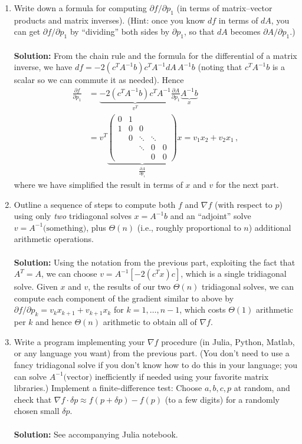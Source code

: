 \documentclass{article}
\begin{document}
\begin{enumerate}
\item Write down a formula for computing $\partial f/\partial p_{1}$ (in
terms of matrix--vector products and matrix inverses). (Hint: once
you know $df$ in terms of $dA$, you can get $\partial f/\partial p_{1}$
by ``dividing'' both sides by $\partial p_{1}$, so that $dA$ becomes
$\partial A/\partial p_{1}$.)
\\
\\
\textbf{Solution:} From the chain rule and the formula for the differential of a matrix inverse, we have $df = -2(c^T A^{-1} b) c^T A^{-1} dA\,A^{-1} b$ (noting that $c^T A^{-1} b$ is a scalar so we can commute it as needed).  Hence
\begin{align*}
\frac{\partial f}{\partial p_1} &= \underbrace{-2(c^T A^{-1} b) c^T A^{-1}}_{v^T} \frac{\partial A}{\partial p_1} \underbrace{A^{-1} b}_x \\
&=  v^T \underbrace{\left(\begin{array}{ccccc}
0 & 1\\
1 & 0 & 0\\
 & 0 & \ddots & \ddots\\
 &  & \ddots & 0 & 0\\
 &  &  & 0 & 0
\end{array}\right)}_{\frac{\partial A}{\partial p_1}} x = \boxed{v_1 x_2 + v_2 x_1} \, ,
\end{align*}
where we have simplified the result in terms of $x$ and $v$ for the next part.

\item Outline a sequence of steps to compute both $f$ and $\nabla f$ (with
respect to $p$) using only \emph{two} tridiagonal solves $x=A^{-1}b$
and an ``adjoint'' solve $v=A^{-1}\text{(something)}$, plus $\Theta(n)$
(i.e., roughly proportional to $n$) additional arithmetic operations.
\\
\\
\textbf{Solution:} Using the notation from the previous part, exploiting the fact that $A^T = A$, we can choose $\boxed{v = A^{-1} [-2(c^T x) c]}$, which is a single tridiagonal solve.  Given $x$ and $v$, the results of our two $\Theta(n)$ tridiagonal solves, we can compute each component of the gradient similar to above by $\boxed{\partial f/\partial p_k = v_k x_{k+1} + v_{k+1} x_k}$ for $k=1,\ldots,n-1$, which costs $\Theta(1)$ arithmetic per $k$ and hence $\Theta(n)$ arithmetic to obtain all of $\nabla f$.

\item Write a program implementing your $\nabla f$ procedure (in Julia,
Python, Matlab, or any language you want) from the previous part.
(You don't need to use a fancy tridiagonal solve if you don't know
how to do this in your language; you can solve $A^{-1}\text{(vector)}$
inefficiently if needed using your favorite matrix libraries.) Implement
a finite-difference test: Choose $a,b,c,p$ at random, and check that
$\nabla f\cdot\delta p\approx f(p+\delta p)-f(p)$ (to a few digits)
for a randomly chosen small $\delta p$.
\\
\\
\textbf{Solution:} See accompanying Julia notebook. 



\end{enumerate}
\end{document}
